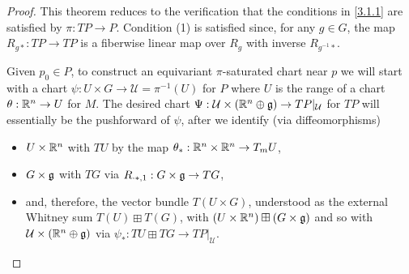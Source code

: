 \begin{proof}
This theorem reduces to the verification that the conditions in \ref{3.1.1} are satisfied by $\pi: TP \to P$. Condition (1) is satisfied since, for any $g \in G$, the map $R_{g*}:TP \to TP$ is a fiberwise linear map over $R_g$ with inverse $R_{g^{-1} *}$.

Given $p_0 \in P$, to construct an equivariant $\pi$-saturated chart near $p$ we will start with a chart $\psi:U \times G \to \mathcal U = \pi^{-1}(U)$ for $P$ where $U$ is the range of a chart $\theta:\mathbb{R}^n \to U$ for $M$. The desired chart $\Psi: \mathcal U \times (\mathbb{R}^n \oplus \mathfrak{g}) \to TP|_{\mathcal U}$ for $TP$ will essentially be the pushforward of $\psi$, after we identify (via diffeomorphisms) 
    \begin{itemize}
    
    \item $U \times \mathbb{R}^n$ with $TU$ by the map $\theta_{*}: \mathbb{R}^n \times \mathbb{R}^n \to T_m U$,  
    
    \item $G \times \mathfrak{g}$ with $TG$ via $R_{\cdot *, 1}: G \times \mathfrak{g} \to T G$,
    
    \item and, therefore, the vector bundle $T(U \times G)$, understood as the external Whitney sum $T(U) \boxplus T(G)$, with $(U \times \mathbb{R}^n) \boxplus (G \times \mathfrak{g})$ and so with $\mathcal U \times (\mathbb{R}^n \oplus \mathfrak{g})$ via $\psi_*: TU \boxplus TG \to TP|_{\mathcal U}$.
    
    \end{itemize}


\end{proof}
